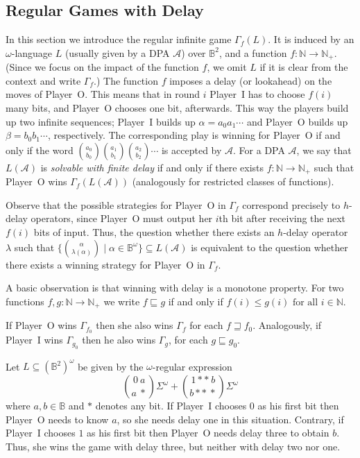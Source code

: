\documentclass[fleqn,envcountsame]{LMCS}
\newcommand{\aut}[1]{\ensuremath{\mathcal{#1}}}
\newcommand{\pI}{Player~I\xspace}
\newcommand{\pO}{Player~O\xspace}
\newcommand{\Gd}[1]{\ensuremath{\Gamma_{#1}}\xspace}
\newcommand{\GdL}[1]{\ensuremath{\Gamma_{#1}(L)}\xspace}
\newcommand{\GdLA}[1]{\ensuremath{\Gamma_{#1}(\LA)}\xspace}
\newcommand{\LA}{\ensuremath{L(\aut{A})}\xspace}
\newcommand{\Nat}{\ensuremath{\mathbb{N}}\xspace}
\newcommand{\Natp}{\ensuremath{\mathbb{N}_+}\xspace}
\newcommand{\B}{\ensuremath{\mathbb{B}}\xspace}
\newcommand{\Bsq}{\ensuremath{\mathbb{B}^2}\xspace}
\newcommand{\Bom}{\ensuremath{\mathbb{B}^{\omega}}\xspace}
\newcommand{\Bsqom}{\ensuremath{(\mathbb{B}^2)^{\omega}}\xspace}
\newcommand{\Som}{\ensuremath{\Sigma^{\omega}}\xspace}
\let\obinom\binom
\renewcommand\binom[2]{
  \Big( { {{#1}} \atop {{#2}} } \Big)
}
\begin{document}
\subsection{Regular Games with Delay}\label{subsec:regular_games_delay}

In this section we introduce the regular infinite game \GdL{f}.
It is induced by an $\omega$-language $L$ (usually given by a DPA \aut{A}) over \Bsq, and a function $f:\Nat\to\Natp$.
(Since we focus on the impact of the function $f$,
we omit $L$ if it is clear from the context and write \Gd{f}.)
The function $f$ imposes a delay (or lookahead) on the moves of \pO.
This means that in round $i$ \pI has to choose $f(i)$
many bits, and \pO chooses one bit, afterwards.
This way the players build up two infinite sequences; \pI builds up
$\alpha = a_0 a_1 \cdots$ and \pO builds up $\beta = b_0 b_1 \cdots$,
respectively. The corresponding play is winning for \pO if and only if
the word $\obinom{a_0}{b_0}\obinom{a_1}{b_1}\obinom{a_2}{b_2}\cdots$
is accepted by \aut{A}.
For a DPA \aut{A}, we say that
\LA is \emph{solvable with finite delay}
if and only if there exists $f:\Nat\to\Natp$ such that \pO wins \GdLA{f}
(analogously for restricted classes of functions).

Observe that the possible strategies for \pO in \Gd{f} correspond precisely
to $h$-delay operators, since \pO must output her $i$th bit after receiving
the next $f(i)$ bits of input. Thus, the question whether there exists
an $h$-delay operator $\lambda$ such that 
$\{\obinom{\alpha}{\lambda(\alpha)} \mid \alpha \in \Bom\} \subseteq L(\aut{A})$
is equivalent to the question whether there exists a winning strategy for
\pO in \Gd{f}.

A basic observation is that winning with delay is a monotone property.
For two functions $f,g: \Nat \to \Natp$ we write
$f\sqsubseteq g$ if and only if $f(i)\leq g(i)\text{ for all } i\in\Nat$.
\begin{rem}\label{rem:winning_monotone}
If \pO wins \Gd{f_0} then she also wins \Gd{f} for each $f\sqsupseteq f_0$.
Analogously, if \pI wins \Gd{g_0} then he also wins \Gd{g},
for each $g\sqsubseteq g_0$.
\end{rem}

\begin{exa}\label{ex:game_with_delay}
Let $L\subseteq\Bsqom$ be given by the $\omega$-regular expression
\[ \obinom{0\:a}{a\:*}\Som+\obinom{1**\:b}{b**\:*}\Som \]
where $a,b\in\B$ and $*$ denotes any bit.
If \pI chooses 0 as his first bit then \pO needs to know $a$,
so she needs delay one in this situation.
Contrary, if \pI chooses $1$ as his first bit then \pO needs delay three
to obtain $b$. Thus, she wins the game with delay three,
but neither with delay two nor one.
\end{exa}
\end{document}
